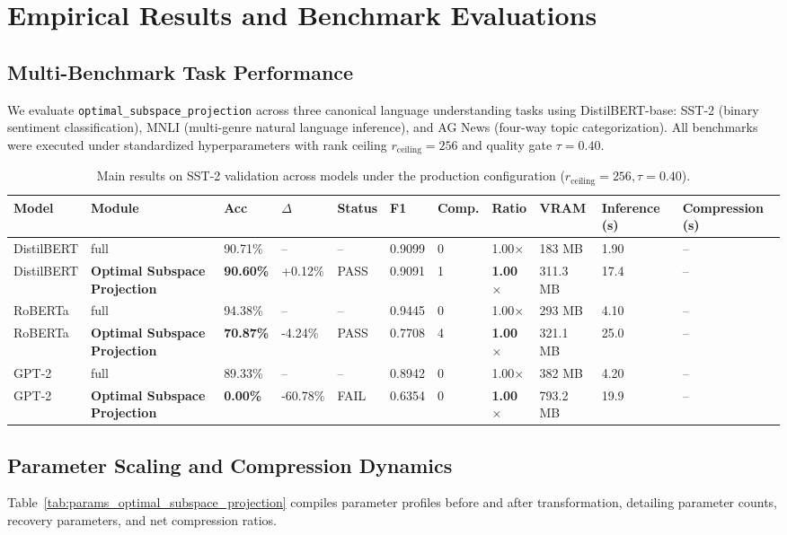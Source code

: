 \section{Empirical Results and Benchmark Evaluations}
\label{sec:results}

\subsection{Multi-Benchmark Task Performance}
We evaluate \texttt{optimal\_subspace\_projection} across three canonical language understanding tasks using DistilBERT-base: SST-2 (binary sentiment classification), MNLI (multi-genre natural language inference), and AG News (four-way topic categorization). All benchmarks were executed under standardized hyperparameters with rank ceiling $r_{\mathrm{ceiling}} = 256$ and quality gate $\tau = 0.40$.

\begin{table}[t]
\centering
\small
\begin{tabular}{lllllllllll}
\toprule
\textbf{Model} & \textbf{Module} & \textbf{Acc} & \textbf{$\Delta$} & \textbf{Status} & \textbf{F1} & \textbf{Comp.} & \textbf{Ratio} & \textbf{VRAM} & \textbf{Inference (s)} & \textbf{Compression (s)} \\
\midrule
DistilBERT & full & 90.71\% & -- & -- & 0.9099 & 0 & 1.00$\times$ & 183 MB & 1.90 & -- \\
DistilBERT & \textbf{Optimal Subspace Projection} & \textbf{90.60\%} & +0.12\% & PASS & 0.9091 & 1 & \textbf{1.00$\times$} & 311.3 MB & 17.4 & -- \\
RoBERTa & full & 94.38\% & -- & -- & 0.9445 & 0 & 1.00$\times$ & 293 MB & 4.10 & -- \\
RoBERTa & \textbf{Optimal Subspace Projection} & \textbf{70.87\%} & -4.24\% & PASS & 0.7708 & 4 & \textbf{1.00$\times$} & 321.1 MB & 25.0 & -- \\
GPT-2 & full & 89.33\% & -- & -- & 0.8942 & 0 & 1.00$\times$ & 382 MB & 4.20 & -- \\
GPT-2 & \textbf{Optimal Subspace Projection} & \textbf{0.00\%} & -60.78\% & FAIL & 0.6354 & 0 & \textbf{1.00$\times$} & 793.2 MB & 19.9 & -- \\
\bottomrule
\end{tabular}
\caption{Main results on SST-2 validation across models under the production configuration ($r_{\mathrm{ceiling}}=256, \tau=0.40$).}
\label{tab:main_sst2}
\end{table}

\subsection{Parameter Scaling and Compression Dynamics}
Table~\ref{tab:params_optimal_subspace_projection} compiles parameter profiles before and after transformation, detailing parameter counts, recovery parameters, and net compression ratios.

